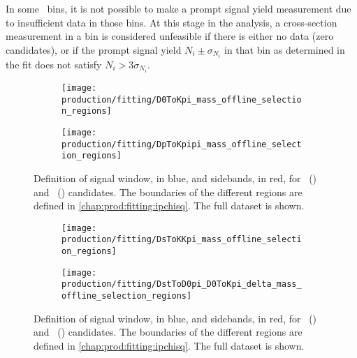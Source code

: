 In some \pTy\ bins, it is not possible to make a prompt signal yield 
measurement due to insufficient data in those bins.
At this stage in the analysis, a cross-section measurement in a bin is 
considered unfeasible if there is either no data (zero candidates), or if the 
prompt signal yield $N_{i} \pm \sigma_{N_{i}}$ in that bin as determined in the 
fit does not satisfy $N_{i} > 3\sigma_{N_{i}}$.

\begin{figure}
  \begin{subfigure}{0.5\textwidth}
    \texttt{[image: production/fitting/D0ToKpi\_mass\_offline\_selection\_regions]}
    \caption{\DzToKpi}
    \label{fig:prod:fitting:regions:D0ToKpi}
  \end{subfigure}
  \begin{subfigure}{0.5\textwidth}
    \texttt{[image: production/fitting/DpToKpipi\_mass\_offline\_selection\_regions]}
    \caption{\DpToKpipi}
    \label{fig:prod:fitting:regions:DpToKpipi}
  \end{subfigure}
  \caption{%
    Definition of signal window, in blue, and sidebands, in red, for 
    \DzToKpi~() and 
    \DpToKpipi~() candidates.
    The boundaries of the different regions are defined in 
    \cref{chap:prod:fitting:ipchisq}.
    The full dataset is shown.
  }
  \label{fig:prod:fitting:regions_A}
\end{figure}

\begin{figure}
  \begin{subfigure}{0.5\textwidth}
    \texttt{[image: production/fitting/DsToKKpi\_mass\_offline\_selection\_regions]}
    \caption{\DspTophipi}
    \label{fig:prod:fitting:regions:DsTophipi}
  \end{subfigure}
  \begin{subfigure}{0.5\textwidth}
    \texttt{[image: production/fitting/DstToD0pi\_D0ToKpi\_delta\_mass\_offline\_selection\_regions]}
    \caption{\DstToDzpi}
    \label{fig:prod:fitting:regions:DstToD0pi_D0ToKpi}
  \end{subfigure}
  \caption{%
    Definition of signal window, in blue, and sidebands, in red, for 
    \DspTophipi~() and 
    \DstToDzpi~() 
    candidates.
    The boundaries of the different regions are defined in 
    \cref{chap:prod:fitting:ipchisq}.
    The full dataset is shown.
  }
  \label{fig:prod:fitting:regions_B}
\end{figure}

